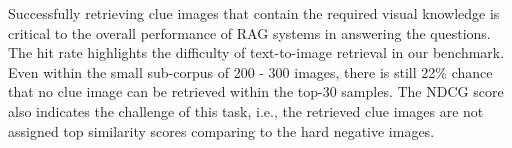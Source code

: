 \begin{table}[ht]
    \centering
    \caption{Retrieval Results using the sub-corpus of 200-300 images for each query. Even within the small species level corpus, the model struggles with our challenging text-to-image retrieval task.}
    \label{tab:ret_result}
\end{table}

Successfully retrieving clue images that contain the required visual knowledge is critical to the overall performance of RAG systems in answering the questions.
The hit rate highlights the difficulty of text-to-image retrieval in our {\dsns} benchmark. Even within the small sub-corpus of 200 - 300 images, there is still 22\% chance that no clue image can be retrieved within the top-30 samples. The NDCG score also indicates the challenge of this task, i.e., the retrieved clue images are not assigned top similarity scores comparing to the hard negative images. 


